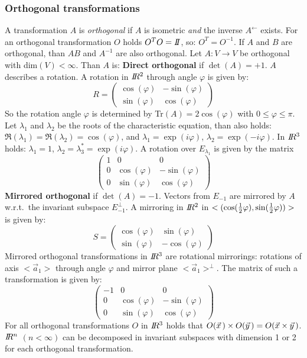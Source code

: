 \documentclass[twoside]{report}
\begin{document}
\subsubsection{Orthogonal transformations}
A transformation $A$ is {\it orthogonal} if $A$ is isometric {\it and}
the inverse $A^\leftarrow$ exists. For an orthogonal transformation $O$ holds
$O^TO=I\hspace{-1mm}I$, so: $O^T=O^{-1}$. If $A$ and $B$ are orthogonal, than $AB$ and
$A^{-1}$ are also orthogonal.
\npar
Let $A:V\rightarrow V$ be orthogonal with dim$(V)<\infty$. Than $A$ is:
\npar
{\bf Direct orthogonal} if $\det(A)=+1$. $A$ describes a rotation.
A rotation in $I\hspace{-1mm}R^2$ through angle $\varphi$ is given by:
\[
R=
\left(\begin{array}{cc}
\cos(\varphi)&-\sin(\varphi)\\
\sin(\varphi)&\cos(\varphi)
\end{array}\right)
\]
So the rotation angle $\varphi$ is determined by Tr$(A)=2\cos(\varphi)$
with $0\leq\varphi\leq\pi$. Let $\lambda_1$ and $\lambda_2$ be the roots of
the characteristic equation, than also holds:
$\Re(\lambda_1)=\Re(\lambda_2)=\cos(\varphi)$, and $\lambda_1=\exp(i\varphi)$,
$\lambda_2=\exp(-i\varphi)$.
\npar
In $I\hspace{-1mm}R^3$ holds: $\lambda_1=1$, $\lambda_2=\lambda_3^*=\exp(i\varphi)$. A
rotation over $E_{\lambda_1}$ is given by the matrix
\[
\left(\begin{array}{ccc}
1&0&0\\
0&\cos(\varphi)&-\sin(\varphi)\\
0&\sin(\varphi)&\cos(\varphi)
\end{array}\right)
\]
{\bf Mirrored orthogonal} if $\det(A)=-1$. Vectors from $E_{-1}$ are mirrored
by $A$ w.r.t.\ the invariant subspace $E^\perp_{-1}$. A mirroring in $I\hspace{-1mm}R^2$
in $<(\cos(\mbox{$\frac{1}{2}$}\varphi),\sin(\mbox{$\frac{1}{2}$}\varphi))>$ is given by:
\[
S=
\left(\begin{array}{cc}
\cos(\varphi)&\sin(\varphi)\\
\sin(\varphi)&-\cos(\varphi)
\end{array}\right)
\]
Mirrored orthogonal transformations in $I\hspace{-1mm}R^3$ are rotational mirrorings:
rotations of axis $<\vec{a}_1>$ through angle $\varphi$ and mirror plane
$<\vec{a}_1>^\perp$. The matrix of such a transformation is given by:
\[
\left(\begin{array}{ccc}
-1&0&0\\
0&\cos(\varphi)&-\sin(\varphi)\\
0&\sin(\varphi)&\cos(\varphi)
\end{array}\right)
\]
For all orthogonal transformations $O$ in $I\hspace{-1mm}R^3$ holds that
$O(\vec{x}\,)\times O(\vec{y}\,)=O(\vec{x}\times\vec{y}\,)$.
\npar
$I\hspace{-1mm}R^n$ $(n<\infty)$ can be decomposed in invariant subspaces with dimension
1 or 2 for each orthogonal transformation.
\end{document}
